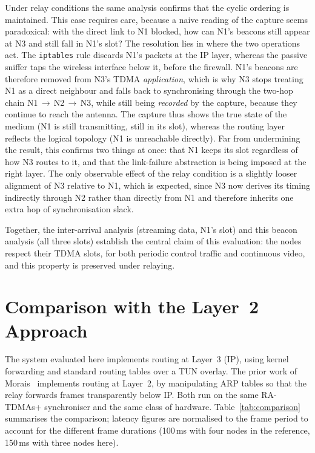 Under relay conditions the same analysis confirms that the cyclic ordering is
maintained. This case requires care, because a naive reading of the capture
seems paradoxical: with the direct link to N1 blocked, how can N1's beacons
still appear at N3 and still fall in N1's slot? The resolution lies in where the
two operations act. The \texttt{iptables} rule discards N1's packets at the IP
layer, whereas the passive sniffer taps the wireless interface below it, before
the firewall. N1's beacons are therefore removed from N3's TDMA
\emph{application}, which is why N3 stops treating N1 as a direct neighbour
and falls back to synchronising through the two-hop chain
N1\,$\to$\,N2\,$\to$\,N3, while still being \emph{recorded} by the capture,
because they continue to reach the antenna. The capture thus shows
the true state of the medium (N1 is still transmitting, still in its slot),
whereas the routing layer reflects the logical topology (N1 is unreachable
directly). Far from undermining the result, this confirms two things at once:
that N1 keeps its slot regardless of how N3 routes to it, and that the
link-failure abstraction is being imposed at the right layer. The only
observable effect of the relay condition is a slightly looser alignment of N3
relative to N1, which is expected, since N3 now derives its timing indirectly
through N2 rather than directly from N1 and therefore inherits one extra hop of
synchronisation slack.

Together, the inter-arrival analysis (streaming data, N1's slot) and this
beacon analysis (all three slots) establish the central claim of this
evaluation: the nodes respect their TDMA slots, for both periodic control
traffic and continuous video, and this property is preserved under relaying.


\section{Comparison with the Layer~2 Approach}
\label{sec:comparison}

The system evaluated here implements routing at Layer~3 (IP), using kernel
forwarding and standard routing tables over a TUN overlay. The prior work of
Morais~\cite{morais2024synchronization} implements routing at Layer~2, by
manipulating ARP tables so that the relay forwards frames transparently below
IP. Both run on the same RA-TDMAs+ synchroniser and the same class of
hardware. Table~\ref{tab:comparison} summarises the comparison; latency
figures are normalised to the frame period to account for the different frame
durations (100\,ms with four nodes in the reference, 150\,ms with three nodes
here).

